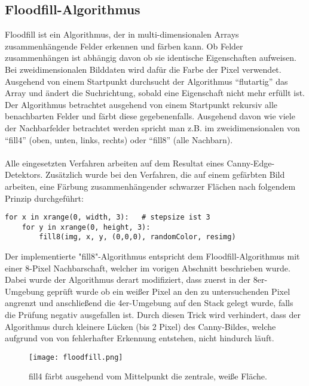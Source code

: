 	\subsection {Floodfill-Algorithmus}
Floodfill ist ein Algorithmus, der in multi-dimensionalen Arrays zusammenhängende Felder erkennen und färben kann. Ob Felder zusammenhängen ist abhängig davon ob sie identische Eigenschaften aufweisen. Bei zweidimensionalen Bilddaten wird dafür die Farbe der Pixel verwendet. Ausgehend von einem Startpunkt durchsucht der Algorithmus “flutartig” das Array und ändert die Suchrichtung, sobald eine Eigenschaft nicht mehr erfüllt ist. \\
Der Algorithmus betrachtet ausgehend von einem Startpunkt rekursiv alle benachbarten Felder und färbt diese gegebenenfalls. Ausgehend davon wie viele der Nachbarfelder betrachtet werden spricht man z.B. im zweidimensionalen von “fill4” (oben, unten, links, rechts) oder “fill8” (alle Nachbarn). \\ \\
Alle eingesetzten Verfahren arbeiten auf dem Resultat eines Canny-Edge-Detektors. Zusätzlich wurde bei den Verfahren, die auf einem gefärbten Bild arbeiten, eine Färbung zusammenhängender schwarzer Flächen nach folgendem Prinzip durchgeführt: \\

\begin{lstlisting}
for x in xrange(0, width, 3):   # stepsize ist 3
	for y in xrange(0, height, 3):
		fill8(img, x, y, (0,0,0), randomColor, resimg)
\end{lstlisting}

Der implementierte "fill8"-Algorithmus entspricht dem Floodfill-Algorithmus mit einer 8-Pixel Nachbarschaft, welcher im vorigen Abschnitt beschrieben wurde. Dabei wurde der Algorithmus derart modifiziert, dass zuerst in der 8er-Umgebung geprüft wurde ob ein weißer Pixel an den zu untersuchenden Pixel angrenzt und anschließend die 4er-Umgebung auf den Stack gelegt wurde, falls die Prüfung negativ ausgefallen ist. Durch diesen Trick wird verhindert, dass der Algorithmus durch kleinere Lücken (bis 2 Pixel) des Canny-Bildes, welche aufgrund von von fehlerhafter Erkennung entstehen, nicht hindurch läuft.

\begin{figure}[H]
  \begin{center}
    \texttt{[image: floodfill.png]}
    \caption{fill4 färbt ausgehend vom Mittelpunkt die zentrale, weiße Fläche.}
    \label{fig:floodfill}
  \end{center}
\end{figure}


